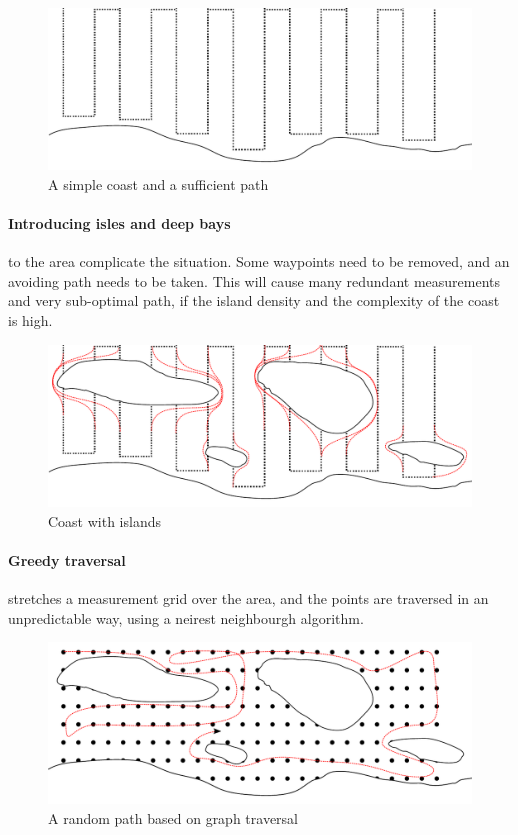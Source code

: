 \begin{figure}[H]
	\centering
	\includegraphics[width=\textwidth]{img/simplecoast}
	\caption{A simple coast and a sufficient path}
	\label{fig:simplecoast}
\end{figure}

\paragraph{Introducing isles and deep bays} to the area complicate the situation. Some waypoints need to be removed, and an avoiding path needs to be taken. This will cause many redundant measurements and very sub-optimal path, if the island density and the complexity of the coast is high.

\begin{figure}[H]
	\centering
	\includegraphics[width=\textwidth]{img/pathislands}
	\caption{Coast with islands}
	\label{fig:pathislands}
\end{figure}

\paragraph{Greedy traversal}

stretches a measurement grid over the area, and the points are traversed in an unpredictable way, using a neirest neighbourgh algorithm.

\begin{figure}[H]
	\centering
	\includegraphics[width=\textwidth]{img/traversal}
	\caption{A random path based on graph traversal}
	\label{fig:traversal}
\end{figure}

